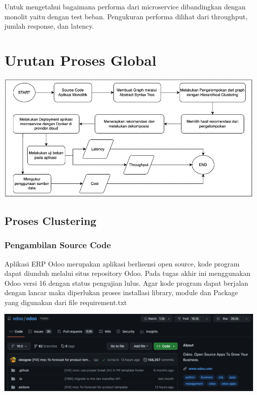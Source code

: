 Untuk mengetahui bagaimana performa dari microservice dibandingkan dengan monolit yaitu dengan test beban. Pengukuran performa dilihat dari throughput, jumlah response, dan latency. 


\section{Urutan Proses Global}
\begin{center}
	\includegraphics[width=14cm]{img/FlowchartProsesGlobal.png}
	\label{fig:asd}
\end{center}

\subsection{Proses Clustering}

\subsubsection{Pengambilan Source Code}
Aplikasi ERP Odoo merupakan aplikasi berlisensi open source, kode program dapat diunduh melalui situs repository Odoo. Pada tugas akhir ini menggunakan Odoo versi 16 dengan status pengujian lulus. Agar kode program dapat berjalan dengan lancar maka diperlukan proses installasi library, module dan Package yang digunakan dari file requirement.txt
\begin{center}
	\includegraphics[width=14cm]{img/bab_3/github.png}
	\label{fig:asd}
\end{center}
